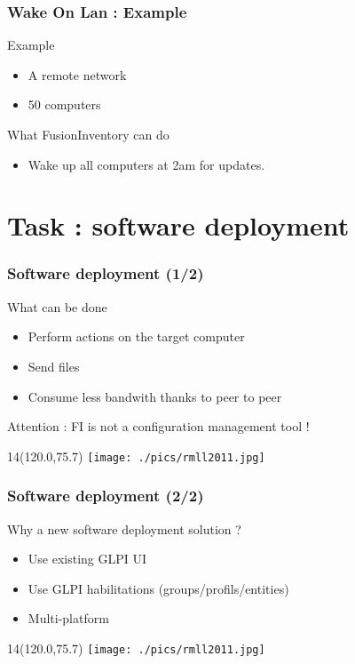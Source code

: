 \documentclass{beamer}
\newcommand{\WorkInProgress}{%
\begin{textblock}{14}(120.0,75.7)
\texttt{[image: ./pics/rmll2011.jpg]}
\end{textblock}
  }
\begin{document}
\begin{frame}
    \frametitle{Wake On Lan : Example}

    \begin{block}{Example}
    \begin{itemize}
    \item A remote network
    \item 50 computers
    \end{itemize}
    \end{block}


    \begin{block}{What FusionInventory can do}
    \begin{itemize}
    \item Wake up all computers at 2am for updates.
    \end{itemize}
    \end{block}

\end{frame}


\section{Task : software deployment}

\begin{frame}
    \frametitle{Software deployment (1/2)}

    \begin{block}{What can be done}
    \begin{itemize}
        \item Perform actions on the target computer
        \item Send files
        \item Consume less bandwith thanks to peer to peer
    \end{itemize}
    Attention : FI is not a configuration management tool !
    \end{block}

\WorkInProgress
\end{frame}

\begin{frame}
    \frametitle{Software deployment (2/2)}

    \begin{block}{Why a new software deployment solution ?}
    \begin{itemize}
        \item Use existing GLPI UI
        \item Use GLPI habilitations (groups/profils/entities)
        \item Multi-platform
    \end{itemize}
    \end{block}

\WorkInProgress
\end{frame}
\end{document}
